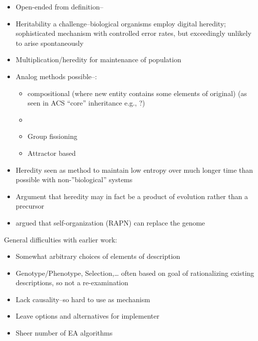 {\autocite{Ruiz-Mirazo2004}}

\begin{itemize}
	\item
	      Open-ended from \autocite{MaynardSmith1999} definition--
	\item
	      Heritability a challenge--biological organisms employ digital
	      heredity; sophisticated mechanism with controlled error rates, but
	      exceedingly unlikely to arise spontaneously
	\item
	      Multiplication/heredity for maintenance of population
	\item
	      Analog methods possible--\eg:
	      	
	      \begin{itemize}
	      	\item
	      	      compositional (where new entity contains some elements of original)
	      	      (as seen in ACS ``core'' inheritance e.g., \autocite{Vasas2015, Watson2012}?)
	      	\item
	      	\item
	      	      Group fissioning \autocite{Watson2015}
	      	\item
	      	      Attractor based \autocite{Szathmary2000}
	      \end{itemize}
	\item
	      Heredity seen as method to maintain low entropy over much longer time
	      than possible with non-''biological'' systems \autocite{Adami2015}
	\item
	      Argument that heredity may in fact be a product of evolution rather than a precursor \autocite{Bourrat2015}
	\item
	      \autocite{Kauffman:1993kk} argued that self-organization (RAPN) can replace the genome
\end{itemize}

General difficulties with earlier work:
\begin{itemize}
	\item Somewhat arbitrary choices of elements of description
	\item Genotype/Phenotype, Selection,\ldots{} often based on goal of rationalizing existing descriptions, so not a re-examination
	\item Lack causality--so hard to use as mechanism
	\item Leave options and alternatives for implementer
	\item Sheer number of EA algorithms
\end{itemize}

